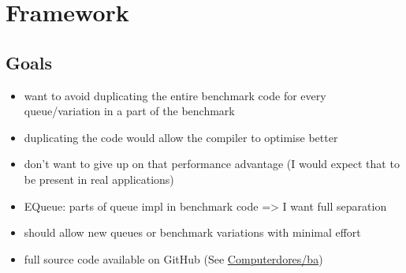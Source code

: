 \section{Framework}
\subsection{Goals}
\begin{itemize}
    \item want to avoid duplicating the entire benchmark code for every queue/variation in a part of the benchmark
    \item duplicating the code would allow the compiler to optimise better
    \item don't want to give up on that performance advantage (I would expect that to be present in real applications)
    \item EQueue: parts of queue impl in benchmark code => I want full separation
    \item should allow new queues or benchmark variations with minimal effort
    \item full source code available on GitHub (See \href{https://github.com/Computerdores/ba}{Computerdores/ba})
\end{itemize}

